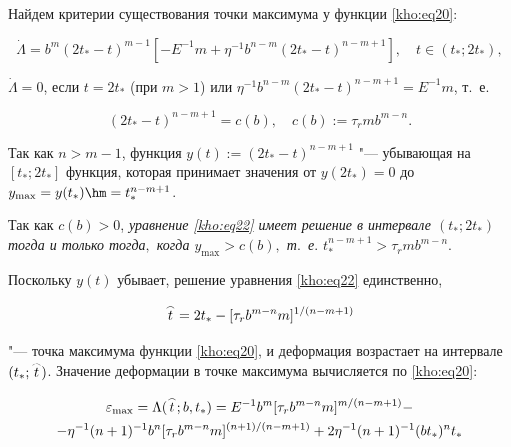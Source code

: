 Найдем критерии существования точки максимума у функции \eqref{kho:eq20}:

\begin{equation}

\label{kho:eq21}

\dot{\Lambda}=b^m(2t_\ast-t)^{m-1}[-E^{-1}m+\eta^{-1}b^{n-m}(2t_\ast-t)^{n-m+1}], \quad t\in(t_\ast;2t_\ast),

\end{equation}

$\dot{\Lambda}=0$, если $t=2t_\ast$ (при $m>1$) или $\eta^{-1}b^{n-m}(2t_\ast-t)^{n-m+1}=E^{-1}m$, т.~е.

\begin{equation}

\label{kho:eq22}

(2t_\ast-t)^{n-m+1}=c(b), \quad c(b):=\tau_rmb^{m-n}.

\end{equation}

Так как $n>m-1$, функция $y(t):=(2t_\ast-t)^{n-m+1}$ "--- убывающая на $[t_\ast;2t_\ast]$ функция,  которая принимает значения от $y(2t_\ast)=0$ до $y_{\max}=y(t_\ast)\hm =t_\ast^{n-m+1}$. 

Так как $c(b)>0$, \textit{уравнение \eqref{kho:eq22} имеет решение в интервале $(t_\ast;2t_\ast)$ тогда и только тогда$,$ когда $y_{\max}>c(b),$ т$.$~е$.$ $t_\ast^{n-m+1}>\tau_rmb^{m-n}.$}



Поскольку $y(t)$ убывает, решение уравнения \eqref{kho:eq22} единственно,

\begin{equation}

\label{kho:eq23}

\mathord{\buildrel{\lower3pt\hbox{$\scriptscriptstyle\frown$}}\over{t}}=2t_\ast-[\tau_rb^{m-n}m]^{1/(n-m+1)}

\end{equation}

"--- точка максимума функции \eqref{kho:eq20}, и деформация возрастает на интервале $(t_\ast;\mathord{\buildrel{\lower3pt\hbox{$\scriptscriptstyle\frown$}}\over{t}})$. Значение деформации в точке максимума вычисляется по \eqref{kho:eq20}:

\begin{multline*}

\varepsilon_{\max}=\Lambda(\mathord{\buildrel{\lower3pt\hbox{$\scriptscriptstyle\frown$}}\over{t}};b,t_\ast)=E^{-1}b^m[\tau_rb^{m-n}m]^{m/(n-m+1)}-

\\

-\eta^{-1}(n+1)^{-1}b^n[\tau_rb^{m-n}m]^{(n+1)/(n-m+1)}+2\eta^{-1}(n+1)^{-1}(bt_\ast)^nt_\ast

\end{multline*}


